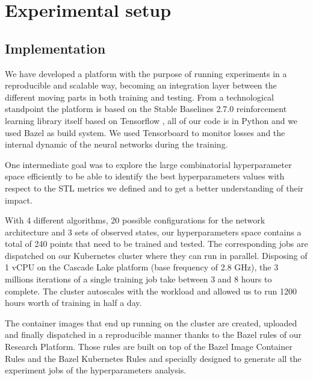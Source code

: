 \documentclass[anonymous=true,format=sigconf, screen=true, review=false]{acmart}
\begin{document}
\section{Experimental setup}

\label{sec:experiments}

\subsection{Implementation}

We have developed a platform with the purpose of running experiments in a reproducible and scalable way, becoming an integration layer between the different moving parts in both training and testing.
From a technological standpoint the platform is based on the Stable Baselines 2.7.0 reinforcement learning library \cite{stable-baselines} itself based on Tensorflow \cite{abadi2016tensorflow}, all of our code is in Python and we used Bazel \cite{Bazel} as build system. We used Tensorboard to monitor losses and the internal dynamic of the neural networks during the training.

One intermediate goal was to explore the large combinatorial hyperparameter space efficiently to be able to identify the best hyperparameters values with respect to the STL metrics we defined and to get a better understanding of their impact.

With 4 different algorithms, 20 possible configurations for the network architecture and 3 sets of observed states, our hyperparameters space contains a total of 240 points that need to be trained and tested. The corresponding jobs are dispatched on our Kubernetes cluster \cite{Kubernetes} where they can run in parallel. Disposing of 1 vCPU on the Cascade Lake platform (base frequency of 2.8 GHz), the 3 millions iterations of a single training job take between 3 and 8 hours to complete. The cluster autoscales with the workload and allowed us to run 1200 hours worth of training in half a day.

The container images that end up running on the cluster are created, uploaded and finally dispatched in a reproducible manner thanks to the Bazel rules of our Research Platform. Those rules are built on top of the Bazel Image Container Rules \cite{bazel-rules-docker} and the Bazel Kubernetes Rules \cite{bazel-rules-k8s} and specially designed to generate all the experiment jobs of the hyperparameters analysis.
\end{document}
